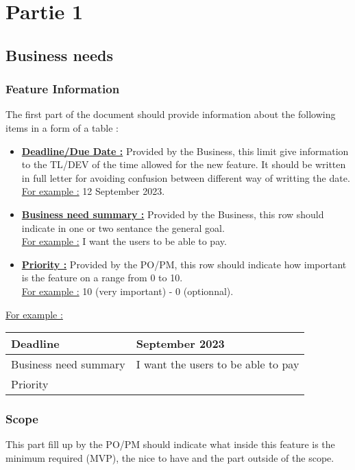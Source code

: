 \documentclass[a4paper,article,oneside]{memoir}
\begin{document}
\tableofcontents
\part{Partie 1}
    \chapter{Business needs}
        \section{Feature Information}
        The first part of the document should provide information about the following items in a form of a table :
        \begin{itemize}
  			\item \textbf{\underline{Deadline/Due Date :}} Provided by the \gls{Business}, this limit give information to the \gls{TL}/\gls{DEV} of the time allowed for the new feature. It should be written in full letter for avoiding confusion between different way of writting the date. \\\underline{For example :} 12 September 2023.
  			 \item \textbf{\underline{Business need summary :}} Provided by the \gls{Business}, this row should indicate in one or two sentance the general goal. \\\underline{For example :} I want the users to be able to pay.
  			 \item \textbf{\underline{Priority :}} Provided by the \gls{PO}/\gls{PM}, this row should indicate how important is the feature on a range from 0 to 10. \\\underline{For example :} 10 (very important) - 0 (optionnal).
		\end{itemize}
		\underline{For example :}

\begin{tabularx}{0.8\textwidth} { 
  | >{\raggedright\arraybackslash}X 
  | >{\raggedright\arraybackslash}X | }
 \hline
 Deadline & 12 September 2023 \\
 \hline
 Business need summary  & I want the users to be able to pay  \\
\hline
 Priority  & 7  \\
\hline
\end{tabularx}
		
        \section{Scope}
        This part fill up by the \gls{PO}/\gls{PM} should indicate what inside this feature is the minimum required (MVP), the nice to have and the part outside of the scope.
        
\end{document}
